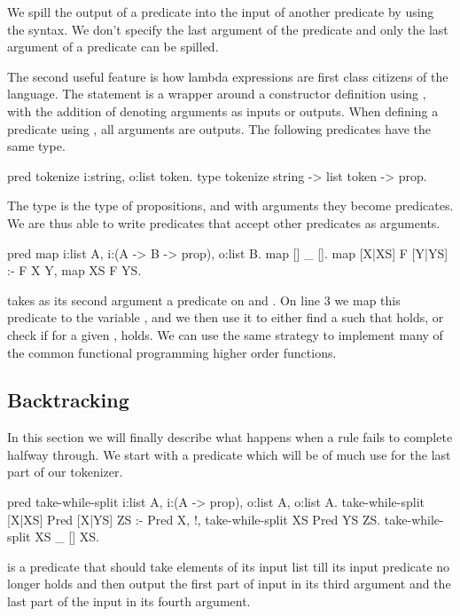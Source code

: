\documentclass[thesis.tex]{subfiles}
\begin{document}
{{We spill the output of a predicate into the input of another predicate by using the \elpii{{ }} syntax. We don't specify the last argument of the predicate and only the last argument of a predicate can be spilled.

The second useful feature is how lambda expressions are first class citizens of the language. The  statement is a wrapper around a constructor definition using , with the addition of denoting arguments as inputs or outputs. When defining a predicate using , all arguments are outputs. The following predicates have the same type.
\begin{elpicode}
  pred tokenize i:string, o:list token.
  type tokenize string -> list token -> prop.
\end{elpicode}
The  type is the type of propositions, and with arguments they become predicates. We are thus able to write predicates that accept other predicates as arguments.
\begin{elpicode}
  pred map i:list A, i:(A -> B -> prop), o:list B.
  map [] _ [].
  map [X|XS] F [Y|YS] :- F X Y, map XS F YS.
\end{elpicode}
 takes as its second argument a predicate on  and . On line 3 we map this predicate to the variable , and we then use it to either find a  such that  holds, or check if for a given ,  holds. We can use the same strategy to implement many of the common functional programming higher order functions.

\subsection{Backtracking} \label{sssec:backtracking}
In this section we will finally describe what happens when a rule fails to complete halfway through. We start with a predicate which will be of much use for the last part of our tokenizer.
\begin{elpicode}
  pred take-while-split i:list A, i:(A -> prop), 
                        o:list A, o:list A.
  take-while-split [X|XS] Pred [X|YS] ZS :- Pred X, !,
    take-while-split XS Pred YS ZS.
  take-while-split XS _ [] XS.
\end{elpicode}
 is a predicate that should take elements of its input list till its input predicate no longer holds and then output the first part of input in its third argument and the last part of the input in its fourth argument.

}}
\end{document}
